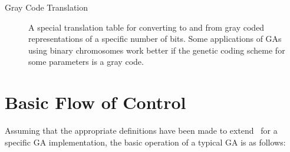 {\begin{description}
\item [Gray Code Translation]  A special translation table for
converting to and from gray coded representations of a specific number of bits. Some
applications of GAs using binary chromosomes work better if the genetic coding scheme for
some parameters is a gray code.

\end{description}
}%


\section{Basic Flow of Control}

Assuming that the appropriate definitions have been made to extend \geco\ 
for a specific GA implementation,  the basic operation of a typical GA is 
as follows:
